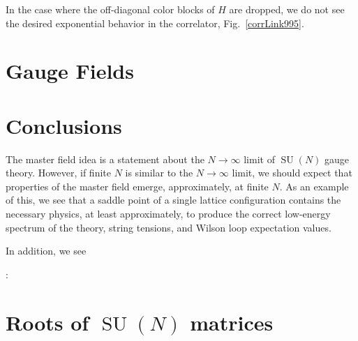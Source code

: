 \documentclass[preprint,aps,prd]{revtex4-2}
\DeclareMathOperator{\SU}{SU}
\begin{document}
In the case where the off-diagonal color blocks of $H$ are dropped,
we do not see the desired exponential behavior in the correlator,
Fig.~\ref{corrLink995}.

\section{Gauge Fields}



\section{Conclusions}

The master field idea is a statement about the $N\to \infty$ limit
of $\SU(N)$ gauge theory.  However, if finite $N$ is similar
to the $N\to\infty$ limit, we should expect that properties of
the master field emerge, approximately, at finite $N$.
As an example of this, we
see that a saddle point of a single lattice configuration
contains the necessary physics, at least approximately, to produce the
correct low-energy spectrum of the theory, string tensions,
and Wilson loop expectation values.

In addition, we see 

\vspace{10mm}
:

\appendix

\section{Roots of $\SU(N)$ matrices}
\label{roots}
\end{document}
